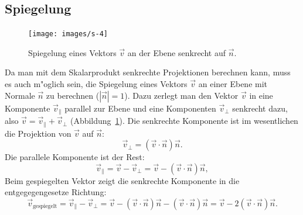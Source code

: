 \subsection{Spiegelung\label{spiegelung}}
\begin{figure}
\begin{center}
\texttt{[image: images/s-4]}
\end{center}
\caption{Spiegelung eines Vektors $\vec v$ an der Ebene senkrecht auf $\vec n$.
\label{image-spiegelung}}
\end{figure}
Da man mit dem Skalarprodukt senkrechte Projektionen berechnen kann,
muss es auch m"oglich sein, die Spiegelung eines Vektors $\vec v$
an einer Ebene mit Normale $\vec n$ zu berechnen ($|\vec n|=1$).
Dazu zerlegt man den Vektor $\vec v$ in eine Komponente $\vec v_{\|}$
parallel zur Ebene und eine Komponenten $\vec v_{\perp}$ senkrecht dazu,
also $\vec v=\vec v_{\|}+\vec v_{\perp}$ (Abbildung~\ref{image-spiegelung}).
Die senkrechte Komponente 
ist im wesentlichen die Projektion von $\vec v$ auf $\vec n$:
\[
\vec v_{\perp}=
(\vec v\cdot\vec n)\vec n
.
\]
Die parallele Komponente ist der Rest:
\[
\vec v_{\|}=\vec v -\vec v_{\perp}=
\vec v-(\vec v\cdot\vec n)\vec n
,
\]
Beim gespiegelten Vektor zeigt die senkrechte Komponente in die
entgegegengesetze Richtung:
\begin{equation}
\vec v_{\text{gespiegelt}}=
\vec v_{\|}-\vec v_{\perp}
=
\vec v-(\vec v\cdot\vec n)\vec n
-
(\vec v\cdot\vec n)\vec n
=\vec v-2(\vec v\cdot\vec n)\vec n.
\label{spiegelung}
\end{equation}

